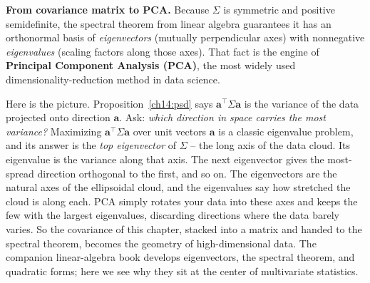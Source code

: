 \begin{connectionbox}
\textbf{From covariance matrix to PCA.} Because $\Sigma$ is symmetric and positive
semidefinite, the spectral theorem from linear algebra guarantees it has an
orthonormal basis of \emph{eigenvectors} (mutually perpendicular axes) with nonnegative \emph{eigenvalues} (scaling factors along those axes). That
fact is the engine of \textbf{Principal Component Analysis (PCA)}, the most widely
used dimensionality-reduction method in data science.

Here is the picture. Proposition~\ref{ch14:psd} says $\mathbf{a}^\top \Sigma
\mathbf{a}$ is the variance of the data projected onto direction $\mathbf{a}$. Ask:
\emph{which direction in space carries the most variance?} Maximizing
$\mathbf{a}^\top \Sigma \mathbf{a}$ over unit vectors $\mathbf{a}$ is a classic
eigenvalue problem, and its answer is the \emph{top eigenvector} of $\Sigma$ -- the
long axis of the data cloud. Its eigenvalue is the variance along that axis. The
next eigenvector gives the most-spread direction orthogonal to the first, and so on.
The eigenvectors are the natural axes of the ellipsoidal cloud, and the eigenvalues
say how stretched the cloud is along each. PCA simply rotates your data into these
axes and keeps the few with the largest eigenvalues, discarding directions where the
data barely varies. So the covariance of this chapter, stacked into a matrix and
handed to the spectral theorem, becomes the geometry of high-dimensional data. The
companion linear-algebra book develops eigenvectors, the spectral theorem, and
quadratic forms; here we see why they sit at the center of multivariate statistics.
\end{connectionbox}


